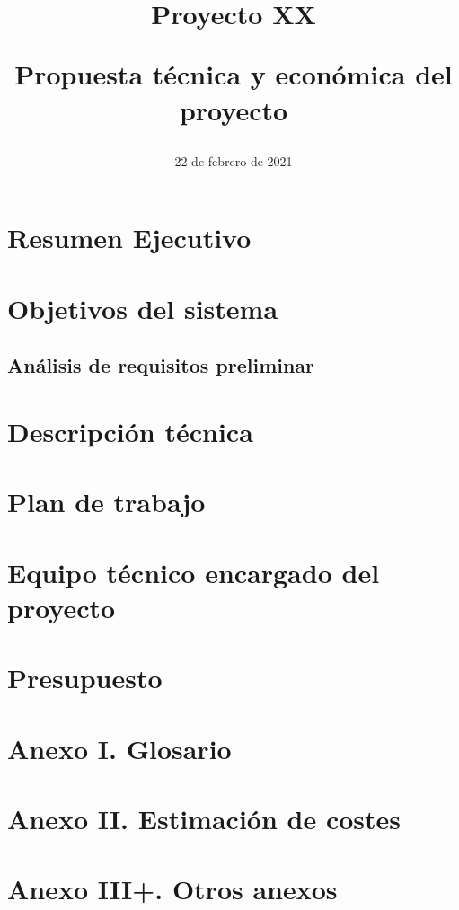 \documentclass{article}
\title{
\Huge{Proyecto XX} \\ 
\begin{Large} 
Propuesta técnica y económica del proyecto
\end{Large}}
\date{22 de febrero de 2021}
\begin{document}
\maketitle

\pagebreak 

\tableofcontents

\pagebreak

\section{Resumen Ejecutivo}

\section{Objetivos del sistema}

\subsection{Análisis de requisitos preliminar}

\section{Descripción técnica}

\section{Plan de trabajo}

\section{Equipo técnico encargado del proyecto}

\section{Presupuesto}

\section*{Anexo I. Glosario}

\section*{Anexo II. Estimación de costes}

\section*{Anexo III+. Otros anexos}
\end{document}

